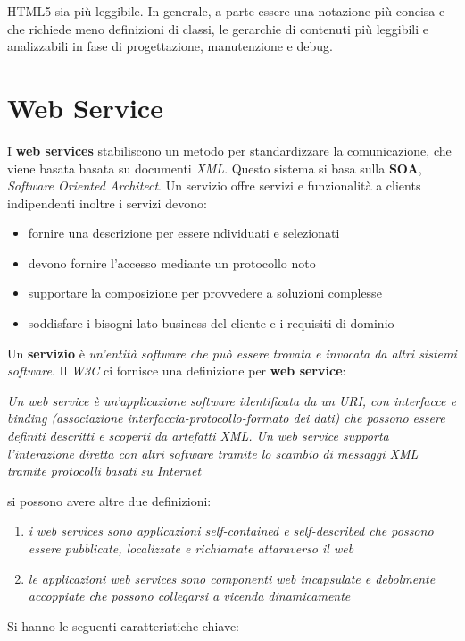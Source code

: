 \documentclass[a4paper,12pt, oneside]{book}
\begin{document}
HTML5 sia più leggibile. In generale, a parte essere una notazione più concisa e che richiede
meno definizioni di classi, le gerarchie di contenuti più leggibili e analizzabili 
in fase di progettazione, manutenzione e debug.
\chapter{Web Service}
I \textbf{web services} stabiliscono un metodo per standardizzare la comunicazione, che viene basata
basata su documenti \textit{XML}. Questo sistema si basa sulla \textbf{SOA}, \textit{Software Oriented Architect}.
Un servizio offre servizi e funzionalità a clients indipendenti inoltre i servizi devono:
\begin{itemize}
\item fornire una descrizione per essere ndividuati e selezionati
\item devono fornire l'accesso mediante un protocollo noto
\item supportare la composizione per provvedere a soluzioni complesse
\item soddisfare i bisogni lato business del cliente e i requisiti di dominio 
\end{itemize}
Un \textbf{servizio} è \textit{un'entità software che può essere trovata e invocata da altri sistemi software}.
Il \textit{W3C} ci fornisce una definizione per \textbf{web service}:
\begin{center}
  \textit{Un web service è un'applicazione software identificata da un URI, con interfacce e binding
    (associazione interfaccia-protocollo-formato dei dati) che possono essere definiti descritti e scoperti da artefatti XML.
    Un web service supporta l'interazione diretta con altri software tramite lo scambio di
    messaggi XML tramite protocolli basati su Internet}
\end{center}
si possono avere altre due definizioni:
\begin{enumerate}
\item \textit{i web services sono applicazioni self-contained e self-described che possono essere pubblicate, localizzate e richiamate attaraverso il web}
\item \textit{le applicazioni web services sono componenti web incapsulate e debolmente accoppiate che possono collegarsi a vicenda dinamicamente}
\end{enumerate}
Si hanno le seguenti caratteristiche chiave:
\end{document}
